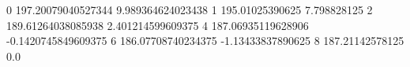 0 197.20079040527344 9.989364624023438
1 195.01025390625 7.798828125
2 189.61264038085938 2.401214599609375
4 187.06935119628906 -0.1420745849609375
6 186.07708740234375 -1.13433837890625
8 187.21142578125 0.0
